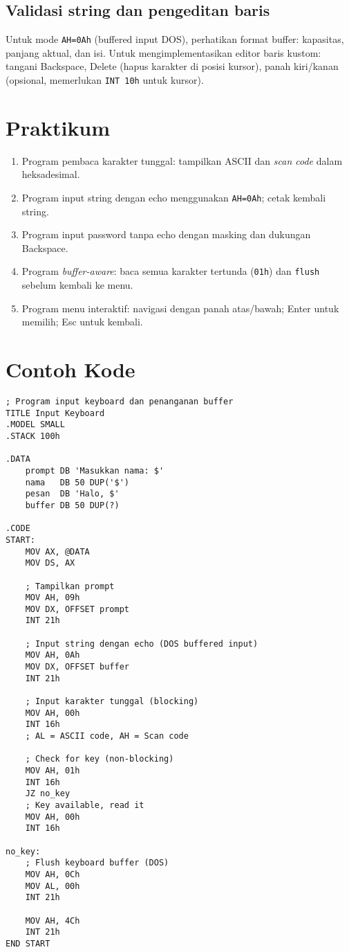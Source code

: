 \subsection{Validasi string dan pengeditan baris}
Untuk mode \texttt{AH=0Ah} (buffered input DOS), perhatikan format buffer: kapasitas, panjang aktual, dan isi. Untuk mengimplementasikan editor baris kustom: tangani Backspace, Delete (hapus karakter di posisi kursor), panah kiri/kanan (opsional, memerlukan \texttt{INT 10h} untuk kursor). \cite{dosbox_manual}


\section{Praktikum}
\begin{enumerate}
  \item Program pembaca karakter tunggal: tampilkan ASCII dan \textit{scan code} dalam heksadesimal.
  \item Program input string dengan echo menggunakan \texttt{AH=0Ah}; cetak kembali string.
  \item Program input password tanpa echo dengan masking dan dukungan Backspace.
  \item Program \textit{buffer-aware}: baca semua karakter tertunda (\texttt{01h}) dan \texttt{flush} sebelum kembali ke menu.
  \item Program menu interaktif: navigasi dengan panah atas/bawah; Enter untuk memilih; Esc untuk kembali.
\end{enumerate}

\section{Contoh Kode}
\begin{verbatim}
; Program input keyboard dan penanganan buffer
TITLE Input Keyboard
.MODEL SMALL
.STACK 100h

.DATA
    prompt DB 'Masukkan nama: $'
    nama   DB 50 DUP('$')
    pesan  DB 'Halo, $'
    buffer DB 50 DUP(?)

.CODE
START:
    MOV AX, @DATA
    MOV DS, AX
    
    ; Tampilkan prompt
    MOV AH, 09h
    MOV DX, OFFSET prompt
    INT 21h
    
    ; Input string dengan echo (DOS buffered input)
    MOV AH, 0Ah
    MOV DX, OFFSET buffer
    INT 21h
    
    ; Input karakter tunggal (blocking)
    MOV AH, 00h
    INT 16h
    ; AL = ASCII code, AH = Scan code
    
    ; Check for key (non-blocking)
    MOV AH, 01h
    INT 16h
    JZ no_key
    ; Key available, read it
    MOV AH, 00h
    INT 16h
    
no_key:
    ; Flush keyboard buffer (DOS)
    MOV AH, 0Ch
    MOV AL, 00h
    INT 21h
    
    MOV AH, 4Ch
    INT 21h
END START
\end{verbatim}

